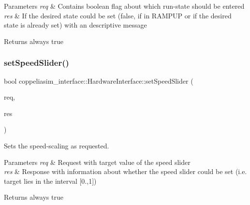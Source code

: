 \begin{DoxyParams}{Parameters}
{\em req} & Contains boolean flag about which run-\/state should be entered \\
\hline
{\em res} & If the desired state could be set (false, if in R\+A\+M\+P\+UP or if the desired state is already set) with an descriptive message \\
\hline
\end{DoxyParams}
\begin{DoxyReturn}{Returns}
always \textquotesingle{}true\textquotesingle{} 
\end{DoxyReturn}
\mbox{\label{classcoppeliasim__interface_1_1HardwareInterface_a0fb3b4bf382fc390db4d8c40036a683b}} 
\subsubsection{\texorpdfstring{set\+Speed\+Slider()}{setSpeedSlider()}}
{\footnotesize\ttfamily bool coppeliasim\+\_\+interface\+::\+Hardware\+Interface\+::set\+Speed\+Slider (\begin{DoxyParamCaption}\item[{ur\+\_\+msgs\+::\+Set\+Speed\+Slider\+Fraction\+Request \&}]{req,  }\item[{ur\+\_\+msgs\+::\+Set\+Speed\+Slider\+Fraction\+Response \&}]{res }\end{DoxyParamCaption})}



Sets the speed-\/scaling as requested. 


\begin{DoxyParams}{Parameters}
{\em req} & Request with target value of the speed slider \\
\hline
{\em res} & Response with information about whether the speed slider could be set (i.\+e. target lies in the interval \mbox{[}0.,1\mbox{]}) \\
\hline
\end{DoxyParams}
\begin{DoxyReturn}{Returns}
always \textquotesingle{}true\textquotesingle{} 
\end{DoxyReturn}
\mbox{\label{classcoppeliasim__interface_1_1HardwareInterface_af3204245bbf1e9e317d5d0a57b3c86c2}} 
